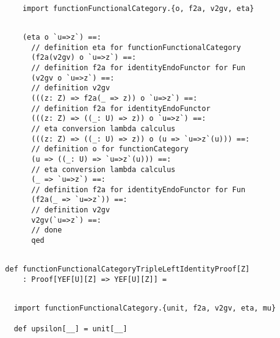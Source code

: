 \documentclass[11pt]{article}
\begin{document}
\vspace{6pt}
\begin{mdframed}[backgroundcolor=lightgray!20] 
\begin{lstlisting}

      import functionFunctionalCategory.{o, f2a, v2gv, eta}
\end{lstlisting}
\end{mdframed}
\vspace{6pt}
\clearpage
\begin{mdframed}[backgroundcolor=lightgray!20] 
\begin{lstlisting} 
      
      (eta o `u=>z`) ==:
        // definition eta for functionFunctionalCategory
        (f2a(v2gv) o `u=>z`) ==:
        // definition f2a for identityEndoFunctor for Fun
        (v2gv o `u=>z`) ==:
        // definition v2gv
        (((z: Z) => f2a(_ => z)) o `u=>z`) ==:
        // definition f2a for identityEndoFunctor
        (((z: Z) => ((_: U) => z)) o `u=>z`) ==:
        // eta conversion lambda calculus
        (((z: Z) => ((_: U) => z)) o (u => `u=>z`(u))) ==:
        // definition o for functionCategory
        (u => ((_: U) => `u=>z`(u))) ==:
        // eta conversion lambda calculus
        (_ => `u=>z`) ==:
        // definition f2a for identityEndoFunctor for Fun
        (f2a(_ => `u=>z`)) ==:
        // definition v2gv
        v2gv(`u=>z`) ==:
        // done
        qed
\end{lstlisting}
\end{mdframed}
\vspace{6pt}
\begin{mdframed}[backgroundcolor=lightgray!20] 
\begin{lstlisting} 

  def functionFunctionalCategoryTripleLeftIdentityProof[Z]
      : Proof[YEF[U][Z] => YEF[U][Z]] =
\end{lstlisting}
\end{mdframed}
\vspace{6pt}
\begin{mdframed}[backgroundcolor=lightgray!20] 
\begin{lstlisting}

    import functionFunctionalCategory.{unit, f2a, v2gv, eta, mu}

    def upsilon[__] = unit[__]
\end{lstlisting}
\end{mdframed}
\vspace{6pt}
\end{document}
